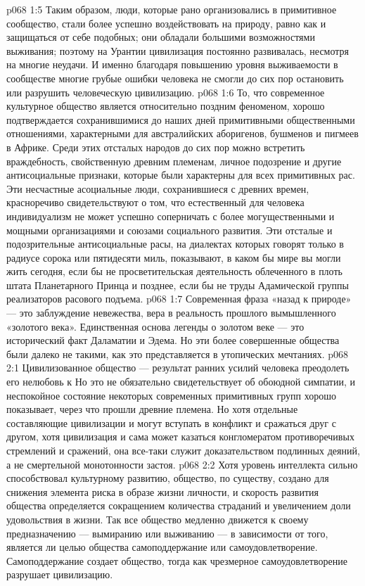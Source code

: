 \vs p068 1:5 Таким образом, люди, которые рано организовались в примитивное сообщество, стали более успешно воздействовать на природу, равно как и защищаться от себе подобных; они обладали большими возможностями выживания; поэтому на Урантии цивилизация постоянно развивалась, несмотря на многие неудачи. И именно благодаря повышению уровня выживаемости в сообществе многие грубые ошибки человека не смогли до сих пор остановить или разрушить человеческую цивилизацию.
\vs p068 1:6 \pc То, что современное культурное общество является относительно поздним феноменом, хорошо подтверждается сохранившимися до наших дней примитивными общественными отношениями, характерными для австралийских аборигенов, бушменов и пигмеев в Африке. Среди этих отсталых народов до сих пор можно встретить враждебность, свойственную древним племенам, личное подозрение и другие антисоциальные признаки, которые были характерны для всех примитивных рас. Эти несчастные асоциальные люди, сохранившиеся с древних времен, красноречиво свидетельствуют о том, что естественный для человека индивидуализм не может успешно соперничать с более могущественными и мощными организациями и союзами социального развития. Эти отсталые и подозрительные антисоциальные расы, на диалектах которых говорят только в радиусе сорока или пятидесяти миль, показывают, в каком бы мире вы могли жить сегодня, если бы не просветительская деятельность облеченного в плоть штата Планетарного Принца и позднее, если бы не труды Адамической группы реализаторов расового подъема.
\vs p068 1:7 Современная фраза «назад к природе» --- это заблуждение невежества, вера в реальность прошлого вымышленного «золотого века». Единственная основа легенды о золотом веке --- это исторический факт Даламатии и Эдема. Но эти более совершенные общества были далеко не такими, как это представляется в утопических мечтаниях.
\vs p068 2:1 Цивилизованное общество --- результат ранних усилий человека преодолеть его нелюбовь к  Но это не обязательно свидетельствует об обоюдной симпатии, и неспокойное состояние некоторых современных примитивных групп хорошо показывает, через что прошли древние племена. Но хотя отдельные составляющие цивилизации и могут вступать в конфликт и сражаться друг с другом, хотя цивилизация и сама может казаться конгломератом противоречивых стремлений и сражений, она все\hyp{}таки служит доказательством подлинных деяний, а не смертельной монотонности застоя.
\vs p068 2:2 Хотя уровень интеллекта сильно способствовал культурному развитию, общество, по существу, создано для снижения элемента риска в образе жизни личности, и скорость развития общества определяется сокращением количества страданий и увеличением доли удовольствия в жизни. Так все общество медленно движется к своему предназначению --- вымиранию или выживанию --- в зависимости от того, является ли целью общества самоподдержание или самоудовлетворение. Самоподдержание создает общество, тогда как чрезмерное самоудовлетворение разрушает цивилизацию.
